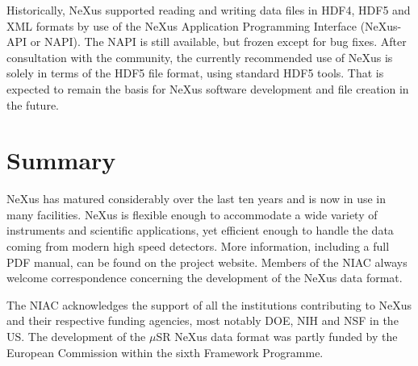 \documentclass[%
 aip,
rsi,
 amsmath,amssymb,
 reprint,%
]{revtex4-1}
\begin{document}
Historically, NeXus supported reading and writing data files in HDF4, HDF5 and
XML formats by use of the NeXus Application Programming Interface
(NeXus-API or NAPI).  The NAPI is still available, but frozen except for bug fixes.
After consultation with the community, the currently recommended use of
NeXus is solely in terms of the HDF5 file format, using standard HDF5 tools.
That is expected to remain the basis for NeXus software development and
file creation in the future.

\section{Summary}

NeXus has matured considerably over the last ten years and is now in use in many facilities. NeXus 
is flexible enough to accommodate a wide variety of instruments and scientific applications,
yet efficient enough to handle the data coming from modern high speed detectors.
More information, including a full PDF manual, can be found on the project 
website\cite{nxwww}.  Members of the NIAC\cite{niac}
always welcome correspondence concerning the development of the NeXus data format.

\begin{acknowledgments}
The NIAC acknowledges the support of all the institutions contributing to NeXus and their respective 
funding agencies, most notably DOE, NIH and NSF in the US. The development of the $\mu$SR NeXus data format was partly 
funded by the European Commission within the sixth Framework Programme. 
\end{acknowledgments}

\nocite{*}
\end{document}
